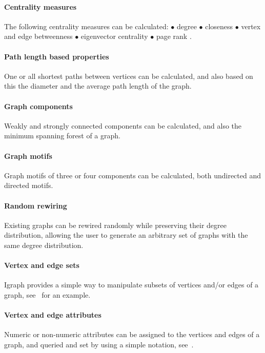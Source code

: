 \documentclass[twoside]{book}%
\begin{document}
\paragraph{Centrality measures} The following centrality measures can
be calculated: $\bullet$ degree $\bullet$ closeness $\bullet$
vertex and edge betweenness $\bullet$ eigenvector centrality $\bullet$
page rank \cite{page98}.

\paragraph{Path length based properties} One or all shortest paths
between vertices can be calculated, and also based on this the
diameter and the average path length of the graph.

\paragraph{Graph components} Weakly and strongly connected components
can be calculated, and also the minimum spanning forest of a graph.

\paragraph{Graph motifs} Graph motifs of three or four components can
be calculated, both undirected and directed motifs.

\paragraph{Random rewiring} Existing graphs can be rewired randomly
while preserving their degree distribution, allowing the user to
generate an arbitrary set of graphs with the same degree distribution.

\paragraph{Vertex and edge sets} Igraph provides a simple way to
manipulate subsets of vertices and/or edges of a graph,
see~ for an example. 

\paragraph{Vertex and edge attributes} Numeric or non-numeric
attributes can be assigned to the vertices and edges of a graph, and
queried and set by using a simple notation, see~. 
\end{document}
